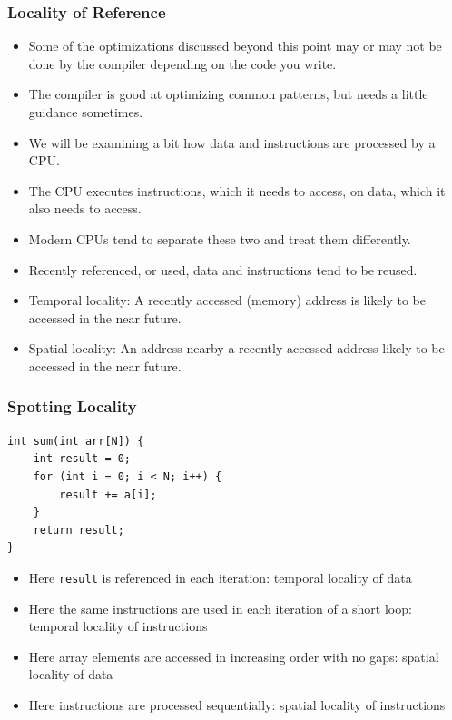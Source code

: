 \documentclass{beamer}
\begin{document}
\begin{frame}[plain]
    \frametitle{Locality of Reference}
    \begin{itemize}
        \item Some of the optimizations discussed beyond this point may or may not be done by the compiler depending on the code you write.
        \item<2-> The compiler is good at optimizing common patterns, but needs a little guidance sometimes.
        \item<3-> We will be examining a bit how data and instructions are processed by a CPU.
        \item<4-> The CPU executes instructions, which it needs to access, on data, which it also needs to access.
        \item<5-> Modern CPUs tend to separate these two and treat them differently.
        \item<6-> Recently referenced, or used, data and instructions tend to be reused.
        \item<7-> Temporal locality: A recently accessed (memory) address is likely to be accessed in the near future.
        \item<8-> Spatial locality: An address nearby a recently accessed address likely to be accessed in the near future.
    \end{itemize}
\end{frame}

\begin{frame}
    \frametitle{Spotting Locality}
    \begin{scriptsize}
        \begin{verbatim}
int sum(int arr[N]) {
    int result = 0;
    for (int i = 0; i < N; i++) {
        result += a[i];
    }
    return result;
}
        \end{verbatim}
    \end{scriptsize}
    \begin{itemize}
        \item<2-> Here \texttt{result} is referenced in each iteration: temporal locality of data
        \item<3-> Here the same instructions are used in each iteration of a short loop: temporal locality of instructions
        \item<4-> Here array elements are accessed in increasing order with no gaps: spatial locality of data
        \item<5-> Here instructions are processed sequentially: spatial locality of instructions
    \end{itemize}
\end{frame}
\end{document}
